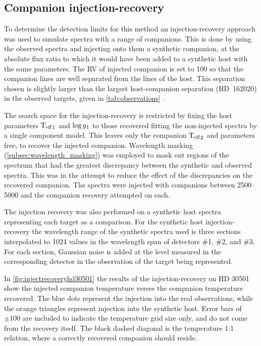 
\subsection{Companion injection-recovery}
\label{subsec:injection-recovery}
To determine the detection limits for this method an injection-recovery approach was used to simulate spectra with a range of companions.
This is done by using the observed spectra and injecting onto them a synthetic companion, at the absolute flux ratio to which it would have been added to a synthetic host with the same parameters.
The {RV} of injected companion is set to 100\kmps{} so that the companion lines are well separated from the lines of the host.
This separation chosen is slightly larger than the largest host-companion separation ({HD~162020}) in the observed targets, given in \cref{tab:observations} \Rvtwo{}.

The search space for the injection-recovery is restricted by fixing the host parameters \({\textrm{T}_{\mathrm{eff}}}_{1}\) and \(\log{g}{}_{1}\) to those recovered fitting the non-injected spectra by a single component model.
This leaves only the companion \({\textrm{T}_{\mathrm{eff}}}_{2}\) and \Rvtwo{} parameters free, to recover the injected companion.
Wavelength masking (\cref{subsec:wavelength_masking}) was employed to mask out regions of the spectrum that had the greatest discrepancy between the synthetic and observed spectra.
This was in the attempt to reduce the effect of the discrepancies on the recovered companion.
The spectra were injected with companions between 2500--5000\K{} and the companion recovery attempted on each.

The injection recovery was also performed on a synthetic host spectra representing each target as a comparison.
For the synthetic host injection-recovery the wavelength range of the synthetic spectra used is three sections interpolated to 1024 values in the wavelength span of detectors \#1, \#2, and \#3.
For each section, Gaussian noise is added at the level measured in the corresponding detector in the observation of the target being represented.

In \cref{fig:injectrecoveryhd30501} the results of the injection-recovery on {HD 30501} show the injected companion temperature verses the companion temperature recovered.
The blue dots represent the injection into the real observations, while the orange triangles represent injection into the synthetic host.
Error bars of \(\pm100\)\K{} are included to indicate the temperature grid size only, and do not come from the recovery itself.
The black dashed diagonal is the temperature 1:1 relation, where a correctly recovered companion should reside.

